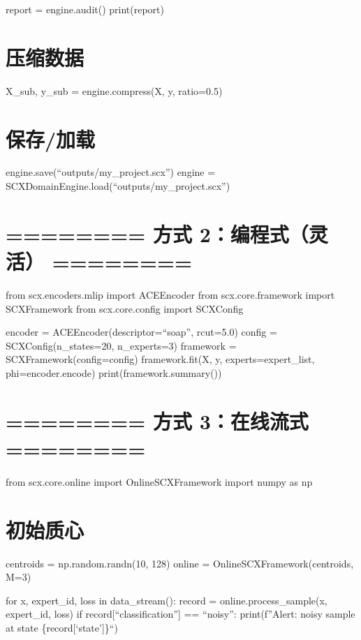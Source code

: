 \documentclass[
  12pt,
]{ctexart}
\begin{document}
report = engine.audit() print(report)

\section{压缩数据}\label{ux538bux7f29ux6570ux636e}

X\_sub, y\_sub = engine.compress(X, y, ratio=0.5)

\section{保存/加载}\label{ux4fddux5b58ux52a0ux8f7d}

engine.save(``outputs/my\_project.scx'') engine =
SCXDomainEngine.load(``outputs/my\_project.scx'')

\section{======== 方式 2：编程式（灵活）
========}\label{ux65b9ux5f0f-2ux7f16ux7a0bux5f0fux7075ux6d3b}

from scx.encoders.mlip import ACEEncoder from scx.core.framework import
SCXFramework from scx.core.config import SCXConfig

encoder = ACEEncoder(descriptor=``soap'', rcut=5.0) config =
SCXConfig(n\_states=20, n\_experts=3) framework =
SCXFramework(config=config) framework.fit(X, y, experts=expert\_list,
phi=encoder.encode) print(framework.summary())

\section{======== 方式 3：在线流式
========}\label{ux65b9ux5f0f-3ux5728ux7ebfux6d41ux5f0f}

from scx.core.online import OnlineSCXFramework import numpy as np

\section{初始质心}\label{ux521dux59cbux8d28ux5fc3}

centroids = np.random.randn(10, 128) online =
OnlineSCXFramework(centroids, M=3)

for x, expert\_id, loss in data\_stream(): record =
online.process\_sample(x, expert\_id, loss) if
record{[}``classification''{]} == ``noisy'': print(f''Alert: noisy
sample at state \{record{[}`state'{]}\}``)
\end{document}
